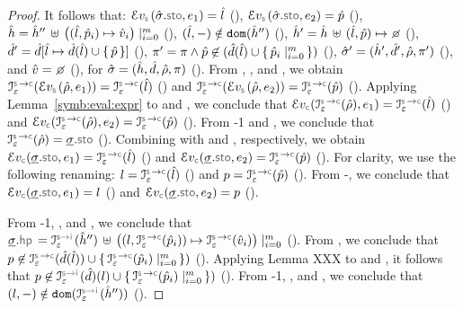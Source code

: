 \begin{proof}
  \noindent {} It follows that: $\evalexpr{\symbolic}(\sstate.\stosel, \jsilexpr_1) = \sloc$ (), 
$\evalexpr{\symbolic}(\sstate.\stosel, \jsilexpr_2) = \sexprp$ (), 
$\hat{h} = \hat{h}'' \, \uplus \, \big((\hat{l}, \hat{p}_i) \mapsto \hat{v}_i \big)\mid_{i = 0}^m$ (), 
$(\hat{l},-) \notin \texttt{dom} (\hat{h}'')$  (), 
$\sheap' = \sheap \dunion (\sloc, \sexprp) \mapsto \none$ (),
$\hat{d}' = \hat{d}[\hat{l} \mapsto \hat{d}(\hat{l}) \cup \{ \, \hat{p} \, \}]$ (), 
$\pi' = \pi \wedge \hat{p} \not\in (\hat{d}(\hat{l}) \cup \{ \, \hat{p}_i \mid_{i=0}^m \, \})$ (), 
$\hat{\sigma}' = (\hat{h}', \hat{d}', \hat\rho, \pi')$ (), and 
$\sexprv = \none$ (), for $\hat{\sigma} = (\hat{h}, \hat{d}, \hat\rho, \pi)$ (). 
From , , and , we obtain 
 $\interpret{\symbconc}{\senv}(\evalexpr{\symbolic}(\sstore, \jsilexpr_1))= \interpret{\symbconc}{\senv}(\sloc)$ () 
 and 
 $\interpret{\symbconc}{\senv}(\evalexpr{\symbolic}(\sstore, \jsilexpr_2))= \interpret{\symbconc}{\senv}(\sexprp)$ (). 
 Applying Lemma~\ref{symb:eval:expr} to  and , we conclude that 
$\evalexpr{\concrete}(\interpret{\symbconc}{\senv}(\sstore), \jsilexpr_1) = \interpret{\symbconc}{\senv}(\sloc)$ ()
and 
$\evalexpr{\concrete}(\interpret{\symbconc}{\senv}(\sstore), \jsilexpr_2) = \interpret{\symbconc}{\senv}(\sexprp)$ ().
 From \hyp{1} and , we conclude that $\interpret{\symbconc}{\senv}(\sstore) = \istate.\stosel$ (). 
Combining  with  and , respectively, we obtain
 $\evalexpr{\concrete}(\istate.\stosel, \jsilexpr_1) = \interpret{\symbconc}{\senv}(\sloc)$ ()
and 
$\evalexpr{\concrete}(\istate.\stosel, \jsilexpr_2) = \interpret{\symbconc}{\senv}(\sexprp)$ ().
For clarity, we use the following renaming: $\loc = \interpret{\symbconc}{\senv}(\sloc)$ () and 
$p = \interpret{\symbconc}{\senv}(\sexprp)$ (). From -, we conclude 
that  $\evalexpr{\concrete}(\istate.\stosel, \jsilexpr_1) = \loc$ () and 
$\evalexpr{\concrete}(\istate.\stosel, \jsilexpr_2) = p$ ().

 \noindent From \hyp{1}, , and , we conclude that 
 $\istate.\hpsel = \interpret{\symbinst}{\senv}(\sheap'') \, \uplus  \, \big((\loc, \interpret{\symbconc}{\senv}(\sexprp_i)) \mapsto 
 \interpret{\symbconc}{\senv}(\sexprv_i) \big)\mid_{i = 0}^m$ ().
 From , we conclude that $p \not\in \interpret{\symbconc}{\senv}(\sdom(\sloc)) \cup \jsilset{\interpret{\symbconc}{\senv}(\sexprp_i) \mid_{i=0}^m})$ ().
 Applying Lemma XXX to  and , it follows that  
 $p \not\in \interpret{\symbinst}{\senv}(\sdom)(\loc) \cup \jsilset{\interpret{\symbconc}{\senv}(\sexprp_i) \mid_{i=0}^m})$ ().
  From \hyp{1}, , and , we conclude that $(\loc,-) \notin \domain (\interpret{\symbinst}{\senv}(\sheap''))$ (). 
  

\end{proof}

